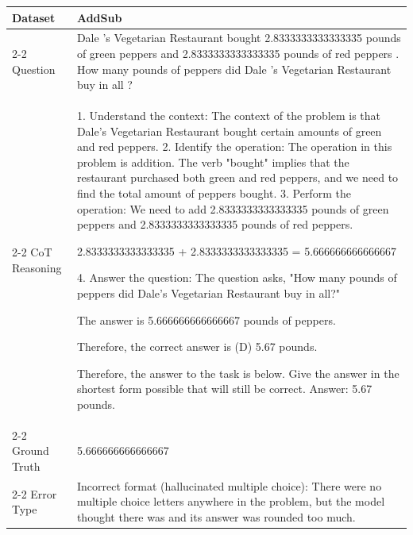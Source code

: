 \begin{longtable} {p{3cm}p{13.85cm}}
Dataset & AddSub \\ \cline{2-2}
Question & Dale 's Vegetarian Restaurant bought 2.8333333333333335 pounds of green peppers and 2.8333333333333335 pounds of red peppers . How many pounds of peppers did Dale 's Vegetarian Restaurant buy in all ? \\ \cline{2-2}
CoT Reasoning & 1. Understand the context: The context of the problem is that Dale's Vegetarian Restaurant bought certain amounts of green and red peppers.
2. Identify the operation: The operation in this problem is addition. The verb "bought" implies that the restaurant purchased both green and red peppers, and we need to find the total amount of peppers bought.
3. Perform the operation: We need to add 2.8333333333333335 pounds of green peppers and 2.8333333333333335 pounds of red peppers.

2.8333333333333335 + 2.8333333333333335 = 5.666666666666667

4. Answer the question: The question asks, "How many pounds of peppers did Dale's Vegetarian Restaurant buy in all?"

The answer is 5.666666666666667 pounds of peppers.

Therefore, the correct answer is (D) 5.67 pounds.

Therefore, the answer to the task is below. Give the answer in the shortest form possible that will still be correct.
Answer: 5.67 pounds. \\ \cline{2-2}
Ground Truth & 5.666666666666667 \\ \cline{2-2}
Error Type & Incorrect format (hallucinated multiple choice): There were no multiple choice letters anywhere in the problem, but the model thought there was and its answer was rounded too much. \\

\midrule


\end{longtable}
